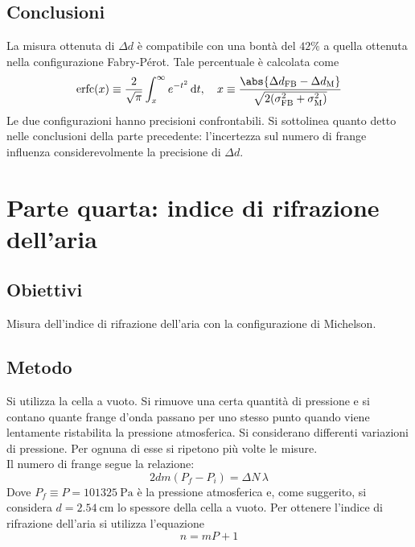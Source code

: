 \documentclass[a4paper]{article}
\begin{document}
\subsection{Conclusioni}
La misura ottenuta di $\Delta d $ è compatibile con una bontà del $42\%$ a quella ottenuta nella configurazione Fabry-Pérot. Tale percentuale è calcolata come
\[
	\operatorname{erfc}(x)\equiv \frac{2}{\sqrt{\pi} }\int_x^{\infty} e^{-t^2}\,\mathrm{d}t,\quad x\equiv \frac{\abs{\Delta d_\text{FB} -\Delta d_\text{M} }}{\sqrt{2(\sigma_\text{FB}^2+\sigma_\text{M} ^2) } }
\] 
Le due configurazioni hanno precisioni confrontabili. Si sottolinea quanto detto nelle conclusioni della parte precedente: l'incertezza sul numero di frange influenza considerevolmente la precisione di $\Delta d $.

\clearpage
\section{Parte quarta: indice di rifrazione dell'aria}
\subsection{Obiettivi}
Misura dell'indice di rifrazione dell'aria con la configurazione di Michelson.

\subsection{Metodo}
Si utilizza la cella a vuoto. Si rimuove una certa quantità di pressione e si contano quante frange d'onda passano per uno stesso punto quando viene lentamente ristabilita la pressione atmosferica. Si considerano differenti variazioni di pressione. Per ognuna di esse si ripetono più volte le misure.\\
Il numero di frange segue la relazione:
\[
	2dm\left( P_f - P_i \right) = \Delta N\,\lambda
\]
Dove $P_f\equiv P = \SI{101325}{\Pa}$ è la pressione atmosferica e, come suggerito, si considera $d=\SI{2.54}{\cm}$ lo spessore della cella a vuoto. Per ottenere l'indice di rifrazione dell'aria si utilizza l'equazione
\[
n=mP+1
\] 
\end{document}
